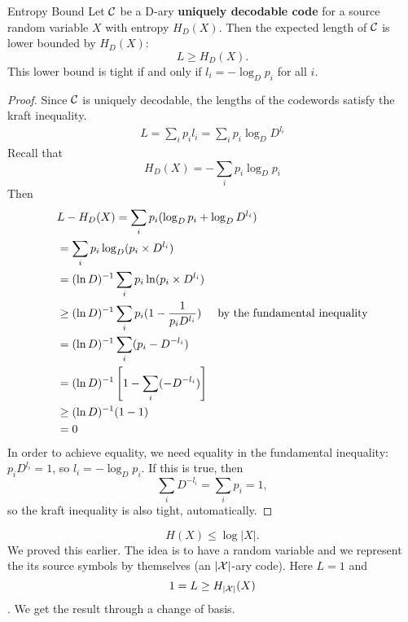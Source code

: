 \documentclass[../main.tex]{subfiles}
\begin{document}
    \begin{bbox}{Entropy Bound}
        Let $\mathcal{C}$ be a D-ary \textbf{uniquely decodable code} for a source random variable $X$ with entropy $H_D(X)$. Then the expected length of $\mathcal{C}$ is lower bounded by $H_D(X)$:\begin{equation*}
            L\geq H_D(X).
        \end{equation*}
        This lower bound is tight if and only if $l_i = -\log_D p_i$ for all $i$.
        \begin{proof}
            Since $\mathcal{C}$ is uniquely decodable, the lengths of the codewords satisfy the kraft inequality. \begin{align*}
                L=\sum_i p_il_i=\sum_ip_i\log_D D^{l_i}
            \end{align*}
            Recall that \begin{equation*}
                H_D(X)=-\sum_ip_i\log_D p_i
            \end{equation*}
            Then \begin{align*}
                &L-H_D(X)=\sum_ip_i(\log_Dp_i+\log_DD^{l_i})\\
                &=\sum_ip_i\log_D(p_i\times D^{l_i})\\
                &=(\ln D)^{-1}\sum_ip_i\ln(p_i\times D^{l_i})\\
                &\geq (\ln D)^{-1}\sum_i p_i (1-\frac{1}{p_iD^{l_i}})\hspace{5mm} \text{by the fundamental inequality}\\
                &= (\ln D)^{-1}\sum_i (p_i-D^{-l_i})\\
                &= (\ln D)^{-1}\left[ 1-\sum_i (-D^{-l_i})\right]\\
                &\geq (\ln D)^{-1}(1-1)\\
                &=0
            \end{align*}
            In order to achieve equality, we need equality in the fundamental inequality: $p_iD^{l_i}=1$, so $l_i=-\log_Dp_i$. If this is true, then \begin{equation*}
                \sum_iD^{-l_i} = \sum_i p_i = 1,
            \end{equation*} so the kraft inequality is also tight, automatically.
        \end{proof}
        \begin{corollary*}
            \begin{equation*}
                H(X)\leq \log|X|.
            \end{equation*} 
            We proved this earlier. The idea is to have a random variable and we represent the its source symbols by themselves (an $|\mathcal{X}|$-ary code). Here $L=1$ and \[
            1=L\geq H_{|\mathcal{X}|}(X)
            \]. We get the result through a change of basis.
        \end{corollary*}
    \end{bbox}
\end{document}
